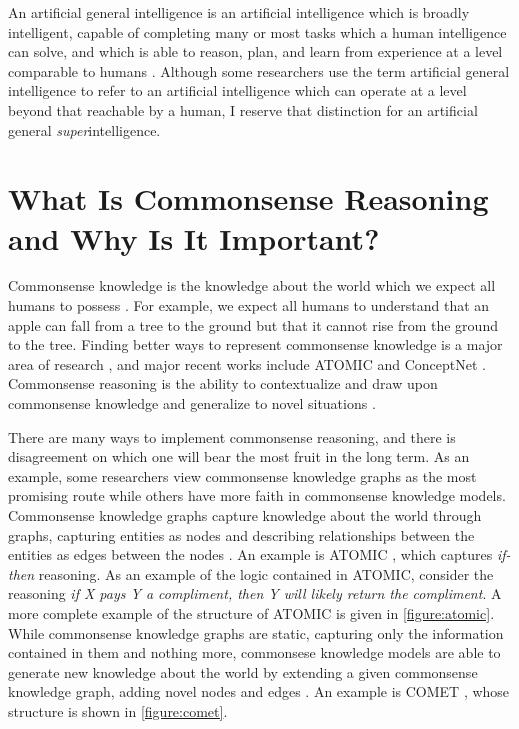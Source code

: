 \documentclass[12pt]{report}
\begin{document}
An artificial general intelligence is an artificial intelligence which is broadly intelligent, capable of completing many or most tasks which a human intelligence can solve, and which is able to reason, plan, and learn from experience at a level comparable to humans \cite{Bubeck2023-gl}.
Although some researchers use the term artificial general intelligence to refer to an artificial intelligence which can operate at a level beyond that reachable by a human, I reserve that distinction for an artificial general \textit{super}intelligence.

\section{What Is Commonsense Reasoning and Why Is It Important?}
\label{section:background--commonsense-reasoning}

Commonsense knowledge is the knowledge about the world which we expect all humans to possess \cite{Ilievski2021-ir}.
For example, we expect all humans to understand that an apple can fall from a tree to the ground but that it cannot rise from the ground to the tree.
Finding better ways to represent commonsense knowledge is a major area of research \cite{Ilievski2021-ir}, and major recent works include ATOMIC \cite{Sap2019-ob} and ConceptNet \cite{Speer2017-vu}.
Commonsense reasoning is the ability to contextualize and draw upon commonsense knowledge and generalize to novel situations \cite{Singh2021-ui}.

There are many ways to implement commonsense reasoning, and there is disagreement on which one will bear the most fruit in the long term.
As an example, some researchers view commonsense knowledge graphs as the most promising route while others have more faith in commonsense knowledge models.
Commonsense knowledge graphs capture knowledge about the world through graphs, capturing entities as nodes and describing relationships between the entities as edges between the nodes \cite{Kim2022-pz}.
An example is ATOMIC \cite{Sap2019-ob}, which captures \textit{if-then} reasoning.
As an example of the logic contained in ATOMIC, consider the reasoning \textit{if \textup{X} pays \textup{Y} a compliment, then \textup{Y} will likely return the compliment}.
A more complete example of the structure of ATOMIC is given in \cref{figure:atomic}.
While commonsense knowledge graphs are static, capturing only the information contained in them and nothing more, commonsese knowledge models are able to generate new knowledge about the world \cite{Kim2022-pz} by extending a given commonsense knowledge graph, adding novel nodes and edges \cite{Kim2022-pz,Bosselut2019-he}.
An example is COMET \cite{Bosselut2019-he}, whose structure is shown in \cref{figure:comet}.
\end{document}
